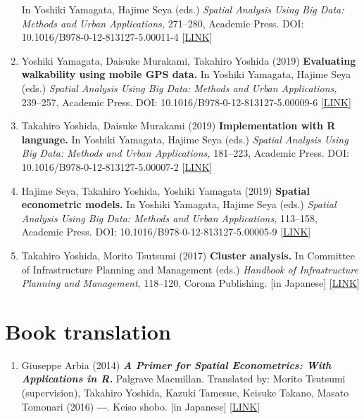 \documentclass[
]{book}
\providecommand{\tightlist}{%
  \setlength{\itemsep}{0pt}\setlength{\parskip}{0pt}}
\begin{document}
\begin{enumerate}
  In Yoshiki Yamagata, Hajime Seya (eds.)
  \emph{Spatial Analysis Using Big Data: Methods and Urban Applications,} 271--280, Academic Press.
  DOI: 10.1016/B978-0-12-813127-5.00011-4 {[}\href{https://www.elsevier.com/books/spatial-analysis-using-big-data/yamagata/978-0-12-813127-5}{LINK}{]}
\item
  Yoshiki Yamagata, Daisuke Murakami, Takahiro Yoshida (2019)
  \textbf{Evaluating walkability using mobile GPS data.}
  In Yoshiki Yamagata, Hajime Seya (eds.)
  \emph{Spatial Analysis Using Big Data: Methods and Urban Applications,} 239--257, Academic Press.
  DOI: 10.1016/B978-0-12-813127-5.00009-6 {[}\href{https://www.elsevier.com/books/spatial-analysis-using-big-data/yamagata/978-0-12-813127-5}{LINK}{]}
\item
  Takahiro Yoshida, Daisuke Murakami (2019)
  \textbf{Implementation with R language.}
  In Yoshiki Yamagata, Hajime Seya (eds.)
  \emph{Spatial Analysis Using Big Data: Methods and Urban Applications,} 181--223, Academic Press.
  DOI: 10.1016/B978-0-12-813127-5.00007-2 {[}\href{https://www.elsevier.com/books/spatial-analysis-using-big-data/yamagata/978-0-12-813127-5}{LINK}{]}
\item
  Hajime Seya, Takahiro Yoshida, Yoshiki Yamagata (2019)
  \textbf{Spatial econometric models.}
  In Yoshiki Yamagata, Hajime Seya (eds.)
  \emph{Spatial Analysis Using Big Data: Methods and Urban Applications,} 113--158, Academic Press.
  DOI: 10.1016/B978-0-12-813127-5.00005-9 {[}\href{https://www.elsevier.com/books/spatial-analysis-using-big-data/yamagata/978-0-12-813127-5}{LINK}{]}
\item
  Takahiro Yoshida, Morito Tsutsumi (2017)
  \textbf{Cluster analysis.}
  In Committee of Infrastructure Planning and Management (eds.)
  \emph{Handbook of Infrastructure Planning and Management}, 118--120, Corona Publishing.
  {[}in Japanese{]} {[}\href{http://www.coronasha.co.jp/doboku-hb.html}{LINK}{]}
\end{enumerate}

\section*{Book translation}\label{book-translation}

\begin{enumerate}
\def\labelenumi{\arabic{enumi}.}
\tightlist
\item
  Giuseppe Arbia (2014)
  \textbf{\emph{A Primer for Spatial Econometrics: With Applications in R.}} Palgrave Macmillan.
  Translated by: Morito Tsutsumi (supervision), Takahiro Yoshida, Kazuki Tamesue, Keisuke Takano, Masato Tomonari (2016) ―. Keiso shobo.
  {[}in Japanese{]} {[}\href{http://www.keisoshobo.co.jp/book/b222571.html}{LINK}{]}
\end{enumerate}
\end{document}
